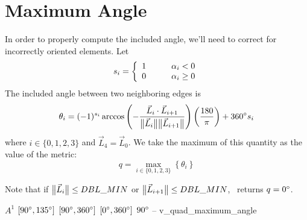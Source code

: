\section{Maximum Angle}

In order to properly compute the included angle, we'll need to
correct for incorrectly oriented elements.
Let
\[
s_i = \left\{ \begin{array}{ll}
  1\rule{2em}{0pt} & \alpha_i < 0\\
  0                & \alpha_i \geq 0
  \end{array}\right.
\]
The included angle between two neighboring edges is
\[
\theta_i = (-1)^{s_i} \arccos{ \left( - \frac {\vec L_{i} \cdot \vec L_{i+1} }
                                {\big\lVert{\vec L_{i}}\big\rVert \big\lVert{\vec L_{i+1}}\big\rVert} \right) } 
                                  \left( \frac {180} {\pi} \right) 
           + 360^{\circ} s_i
\]
where $i\in\{0,1,2,3\}$ and $\vec L_4 = \vec L_0$.
We take the maximum of this quantity as the value of the metric:
\[
q = \max_{i\in\{0,1,2,3\}}\left\{ \theta_i \right\}
\]

Note that if $\big\lVert{\vec L_i}\big\rVert \leq DBL\_MIN$ or $\big\lVert{\vec L_{i+1}}\big\rVert \leq DBL\_MIN$,
\verd\ returns $q = 0^{\circ}$.

%
{$A^1$}%
{$[90^{\circ},135^{\circ}]$}%
{$[90^{\circ},360^{\circ}]$}%
{$[0^{\circ},360^{\circ}]$}%
{$90^{\circ}$}%
{--}%
{v\_quad\_maximum\_angle}%


